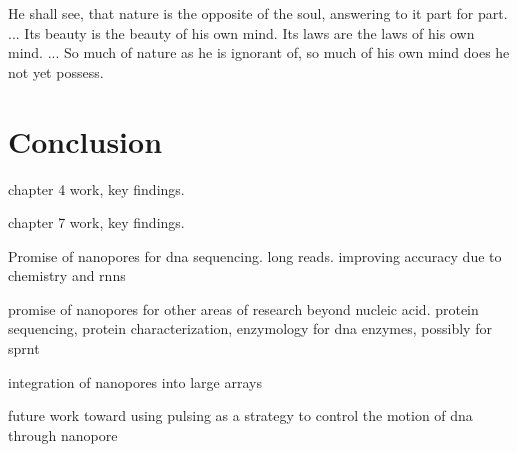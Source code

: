 \begin{savequote}[75mm]
He shall see, that nature is the opposite of the soul, answering to it part for part. ... Its beauty is the beauty of his own mind. Its laws are the laws of his own mind. ... So much of nature as he is ignorant of, so much of his own mind does he not yet possess.
\end{savequote}

\chapter{Conclusion}
\label{conclusion}

chapter 4 work, key findings.

chapter 7 work, key findings.

Promise of nanopores for dna sequencing.  long reads.  improving accuracy due to chemistry and rnns

promise of nanopores for other areas of research beyond nucleic acid.  protein sequencing, protein characterization, enzymology for dna enzymes, possibly for sprnt

integration of nanopores into large arrays

future work toward using pulsing as a strategy to control the motion of dna through nanopore
